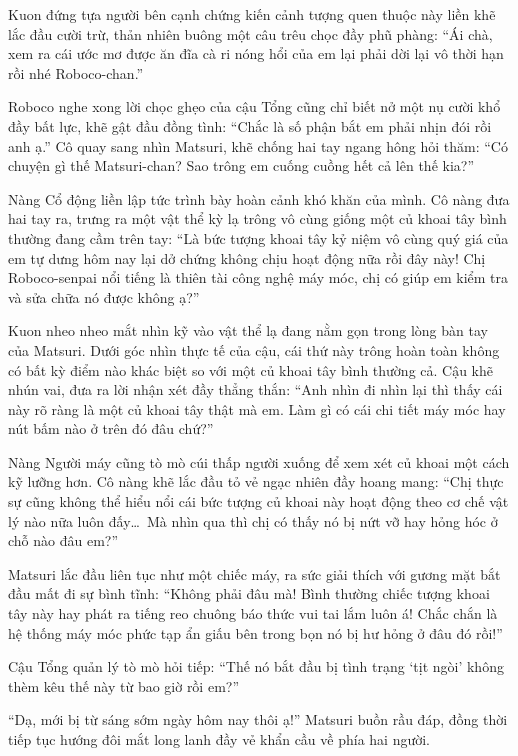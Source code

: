 \documentclass[../main.tex]{subfiles}
\begin{document}

Kuon đứng tựa người bên cạnh chứng kiến cảnh tượng quen thuộc này liền khẽ lắc đầu cười trừ, thản nhiên buông một câu trêu chọc đầy phũ phàng: ``Ái chà, xem ra cái ước mơ được ăn đĩa cà ri nóng hổi của em lại phải dời lại vô thời hạn rồi nhé Roboco-chan.''

Roboco nghe xong lời chọc ghẹo của cậu Tổng cũng chỉ biết nở một nụ cười khổ đầy bất lực, khẽ gật đầu đồng tình: ``Chắc là số phận bắt em phải nhịn đói rồi anh ạ.'' Cô quay sang nhìn Matsuri, khẽ chống hai tay ngang hông hỏi thăm: ``Có chuyện gì thế Matsuri-chan? Sao trông em cuống cuồng hết cả lên thế kia?''

Nàng Cổ động liền lập tức trình bày hoàn cảnh khó khăn của mình. Cô nàng đưa hai tay ra, trưng ra một vật thể kỳ lạ trông vô cùng giống một củ khoai tây bình thường đang cầm trên tay: ``Là bức tượng khoai tây kỷ niệm vô cùng quý giá của em tự dưng hôm nay lại dở chứng không chịu hoạt động nữa rồi đây này! Chị Roboco-senpai nổi tiếng là thiên tài công nghệ máy móc, chị có giúp em kiểm tra và sửa chữa nó được không ạ?''


Kuon nheo nheo mắt nhìn kỹ vào vật thể lạ đang nằm gọn trong lòng bàn tay của Matsuri. Dưới góc nhìn thực tế của cậu, cái thứ này trông hoàn toàn không có bất kỳ điểm nào khác biệt so với một củ khoai tây bình thường cả. Cậu khẽ nhún vai, đưa ra lời nhận xét đầy thẳng thắn: ``Anh nhìn đi nhìn lại thì thấy cái này rõ ràng là một củ khoai tây thật mà em. Làm gì có cái chi tiết máy móc hay nút bấm nào ở trên đó đâu chứ?''

Nàng Người máy cũng tò mò cúi thấp người xuống để xem xét củ khoai một cách kỹ lưỡng hơn. Cô nàng khẽ lắc đầu tỏ vẻ ngạc nhiên đầy hoang mang: ``Chị thực sự cũng không thể hiểu nổi cái bức tượng củ khoai này hoạt động theo cơ chế vật lý nào nữa luôn đấy\dots\ Mà nhìn qua thì chị có thấy nó bị nứt vỡ hay hỏng hóc ở chỗ nào đâu em?''

Matsuri lắc đầu liên tục như một chiếc máy, ra sức giải thích với gương mặt bắt đầu mất đi sự bình tĩnh: ``Không phải đâu mà! Bình thường chiếc tượng khoai tây này hay phát ra tiếng reo chuông báo thức vui tai lắm luôn á! Chắc chắn là hệ thống máy móc phức tạp ẩn giấu bên trong bọn nó bị hư hỏng ở đâu đó rồi!''

Cậu Tổng quản lý tò mò hỏi tiếp: ``Thế nó bắt đầu bị tình trạng `tịt ngòi' không thèm kêu thế này từ bao giờ rồi em?''

``Dạ, mới bị từ sáng sớm ngày hôm nay thôi ạ!'' Matsuri buồn rầu đáp, đồng thời tiếp tục hướng đôi mắt long lanh đầy vẻ khẩn cầu về phía hai người.
\end{document}

